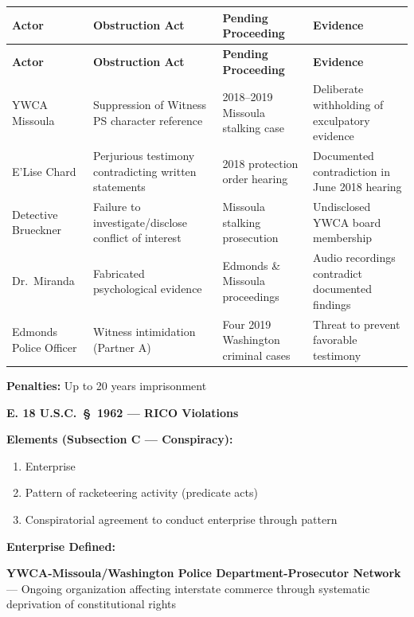 \documentclass[11pt, letterpaper]{article}
\newcommand{\subsectiontitle}[1]{\vspace{0.15in}\noindent\textcolor{NavyBlue}{\textbf{#1}}\vspace{0.05in}}
\begin{document}
\begin{center}
\begin{longtable}{|p{1.1in}|p{1.5in}|p{1.4in}|p{1.6in}|}
\hline
\textbf{Actor} & \textbf{Obstruction Act} & \textbf{Pending Proceeding} & \textbf{Evidence} \\
\hline
\endfirsthead
\hline
\textbf{Actor} & \textbf{Obstruction Act} & \textbf{Pending Proceeding} & \textbf{Evidence} \\
\hline
\endhead
YWCA Missoula & Suppression of Witness PS character reference & 2018--2019 Missoula stalking case & Deliberate withholding of exculpatory evidence \\
\hline
E'Lise Chard & Perjurious testimony contradicting written statements & 2018 protection order hearing & Documented contradiction in June 2018 hearing \\
\hline
Detective Brueckner & Failure to investigate/disclose conflict of interest & Missoula stalking prosecution & Undisclosed YWCA board membership \\
\hline
Dr.\ Miranda & Fabricated psychological evidence & Edmonds \& Missoula proceedings & Audio recordings contradict documented findings \\
\hline
Edmonds Police Officer & Witness intimidation (Partner A) & Four 2019 Washington criminal cases & Threat to prevent favorable testimony \\
\hline
\end{longtable}
\end{center}

\textbf{Penalties:} Up to 20 years imprisonment

\subsectiontitle{E. 18 U.S.C.\ \S\ 1962 --- RICO Violations}

\textbf{Elements (Subsection C --- Conspiracy):}
\begin{enumerate}[leftmargin=*,itemsep=2pt]
    \item Enterprise
    \item Pattern of racketeering activity (predicate acts)
    \item Conspiratorial agreement to conduct enterprise through pattern
\end{enumerate}

\textbf{Enterprise Defined:}

\textbf{YWCA-Missoula/Washington Police Department-Prosecutor Network} --- Ongoing organization affecting interstate commerce through systematic deprivation of constitutional rights
\end{document}
